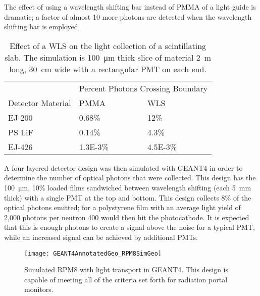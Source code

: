 The effect of using a wavelength shifting bar instead of PMMA of a light guide is dramatic; a factor of almost 10 more photons are detected when the wavelength shifting bar is employed.
  \begin{table}
  \caption[Light Collection Increase with a WLS Bar]{Effect of a WLS on the light collection of a scintillating slab. The simulation is \SI{100}{\um} thick slice of material \SI{2}{\m} long, \SI{30}{\cm} wide with a rectangular PMT on each end.}
  \label{tab:WLSStudy}
  \begin{tabular}{p{4cm} m{3cm} m{3cm}}
  \toprule
  & \multicolumn{2}{c}{Percent Photons Crossing Boundary} \\
  Detector Material & PMMA &  WLS \\
  \midrule
 EJ-200 & 0.68\%  & 12\% \\
 PS LiF & 0.14\% & 4.3\% \\
 EJ-426 & \num{1.3E-3}\% & \num{4.5E-3}\% \\
 \bottomrule
  \end{tabular}
\end{table}

A four layered detector design was then simulated with GEANT4 in order to determine the number of optical photons that were collected.
This design has the \SI{100}{\um}, 10\% loaded  films sandwiched between wavelength shifting (each \SI{5}{\mm} thick) with a single PMT at the top and bottom.
This design collects 8\% of the optical photons emitted; for a polystyrene film with an average light yield of 2,000 photons per neutron 400 would then hit the photocathode.
It is expected that this is enough photons to create a signal above the noise for a typical PMT, while an increased signal can be achieved by additional PMTs.
\begin{figure}
  \centering
	\texttt{[image: GEANT4AnnotatedGeo\_RPM8SimGeo]}
	  \caption[GEANT4 Simulated RPM8 Detector Design]{Simulated RPM8 with light transport in GEANT4. This design is capable of meeting all of the criteria set forth for radiation portal monitors.}
  \label{fig:G4RPM8Geo}
\end{figure}

